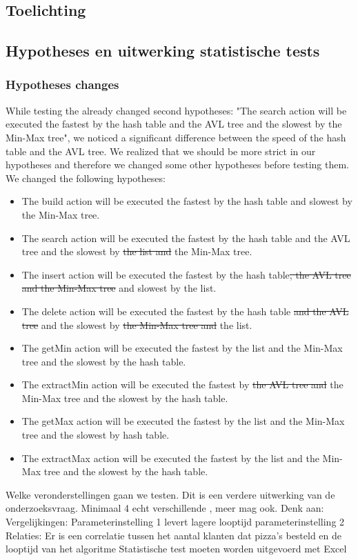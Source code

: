 \documentclass{article}
\begin{document}
\subsection{Toelichting}
\subsection{Hypotheses en uitwerking statistische tests}
\subsubsection{Hypotheses changes}
While testing the already changed second hypotheses: "The search action will be executed the fastest by the hash table and the AVL tree and the slowest by the Min-Max tree", we noticed a significant difference between the speed of the hash table and the AVL tree. We realized that we should be more strict in our hypotheses and therefore we changed some other hypotheses before testing them. We changed the following hypotheses: 
\begin{itemize}
\item The build action will be executed the fastest by the hash table and slowest by the Min-Max tree.
\item The search action will be executed the fastest by the hash table and the AVL tree and the slowest by\sout{ the  list and }the Min-Max tree.
\item The insert action will be executed the fastest by the hash table\sout{, the AVL tree and the Min-Max tree} and slowest by the list.
\item The delete action will be executed the fastest by the hash table \sout{and the AVL tree} and the slowest by \sout{the Min-Max tree and} the list.
\item The getMin action will be executed the fastest by the list and the Min-Max tree and the slowest by the hash table.
\item The extractMin action will be executed the fastest by  \sout{the AVL tree and} the  Min-Max tree and the slowest by the hash table.
\item The getMax action will be executed the fastest by the list and the Min-Max tree and the slowest by hash table.
\item The extractMax action will be executed the fastest by the list and the Min-Max tree and the slowest by the hash table.



\end{itemize}
 Welke veronderstellingen gaan we testen. Dit is een verdere uitwerking van de onderzoeksvraag. Minimaal 4 echt verschillende , meer mag ook. Denk aan:
Vergelijkingen: Parameterinstelling 1 levert lagere looptijd parameterinstelling 2 Relaties: Er is een correlatie tussen het aantal klanten dat pizza's besteld en de looptijd van het algoritme
Statistische test moeten worden uitgevoerd met Excel
\end{document}
